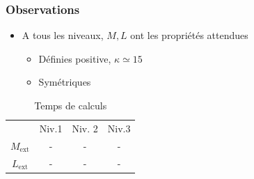\begin{frame}
\frametitle{Observations}

\begin{itemize}
  \item A tous les niveaux, $M,L$ ont les propriétés attendues
    \begin{itemize}
      \item Définies positive, $\kappa \simeq 15$
      \item Symétriques
    \end{itemize}
\end{itemize}


\begin{table}
\begin{tabular}{c|c|c|c}
 & Niv.1 & Niv. 2 & Niv.3\\
$M_{\text{ext}}$ & - & -& - \\
$L_{\text{ext}}$ & - & -& - \\
\end{tabular}
\caption{Temps de calculs}
\end{table}

\end{frame}
